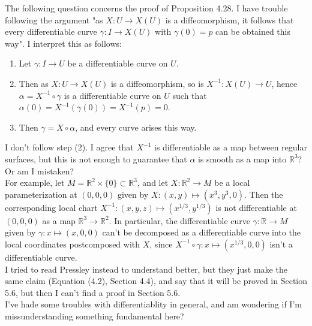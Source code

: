 \documentclass{article}
\theoremstyle{definition}
\newcommand{\R}{\mathbb{R}}
\begin{document}
The following question concerns the proof of Proposition 4.28. I have trouble
following the argument "as $X : U \to X(U)$ is a diffeomorphism, it follows
that every differentiable curve $\gamma : I \to X(U)$ with $\gamma(0) = p$ can
be obtained this way". I interpret this as follows:
\begin{enumerate}
	\item Let $\gamma : I \to U$ be a differentiable curve on $U$.
	\item Then as $X : U \to X(U)$ is a diffeomorphism, so is $X^{-1} : X(U)
		\to U$, hence $\alpha = X^{-1} \circ \gamma$ is a differentiable curve
		on $U$ such that $\alpha(0) = X^{-1}(\gamma(0)) = X^{-1}(p) = 0$.
	\item Then $\gamma = X \circ \alpha$, and every curve arises this way.
\end{enumerate}

I don't follow step (2). I agree that $X^{-1}$ is differentiable as a map
between regular surfaces, but this is not enough to guarantee that $\alpha$ is
smooth as a map into $\R^3$? Or am I mistaken? \\

For example, let $M = \R^{2} \times \{0\} \subset \R^3$, and let $X : \R^2 \to
M$ be a local parameterization at $(0, 0, 0)$ given by $X : (x, y) \mapsto
(x^3, y^3, 0)$. Then the corresponding local chart $X^{-1} : (x, y, z) \mapsto
(x^{1/3}, y^{1/3})$ is not differentiable at $(0, 0, 0)$ as a map $\R^3 \to
\R^2$. In particular, the differentiable curve $\gamma : \R \to M$ given by
$\gamma : x \mapsto (x, 0, 0)$ can't be decomposed as a differentiable curve
into the local coordinates postcomposed with $X$, since $X^{-1} \circ \gamma :
x \mapsto (x^{1/3}, 0, 0)$ isn't a differentiable curve. \\

I tried to read Pressley instead to understand better, but they just make the
same claim (Equation (4.2), Section 4.4), and say that it will be proved in
Section 5.6, but then I can't find a proof in Section 5.6. \\

I've hade some troubles with differentiablity in general, and am wondering if
I'm missunderstanding something fundamental here?
\end{document}
